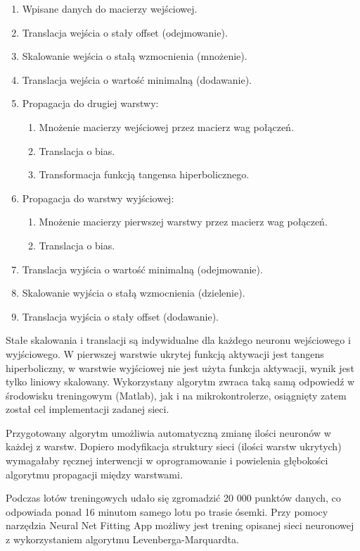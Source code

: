 \documentclass[12pt, a4paper]{article}
\begin{document}
\begin{enumerate}
    \item Wpisane danych do macierzy wejściowej.
	\item Translacja wejścia o stały offset (odejmowanie).
	\item Skalowanie wejścia o stałą wzmocnienia (mnożenie).
	\item Translacja wejścia o wartość minimalną (dodawanie).
	\item Propagacja do drugiej warstwy:
	\begin{enumerate}
		\item Mnożenie macierzy wejściowej przez macierz wag połączeń.
		\item Translacja o bias.
		\item Transformacja funkcją tangensa hiperbolicznego.
	\end{enumerate}
	\item Propagacja do warstwy wyjściowej:
	\begin{enumerate}
		\item Mnożenie macierzy pierwszej warstwy przez macierz wag połączeń.
		\item Translacja o bias.
	\end{enumerate}
	\item Translacja wyjścia o wartość minimalną (odejmowanie).
	\item Skalowanie wyjścia o stałą wzmocnienia (dzielenie).
	\item Translacja wyjścia o stały offset (dodawanie).
\end{enumerate}

Stałe skalowania i translacji są indywidualne dla każdego neuronu wejściowego i wyjściowego. W pierwszej warstwie ukrytej funkcją aktywacji jest tangens hiperboliczny, w warstwie wyjściowej nie jest użyta funkcja aktywacji, wynik jest tylko liniowy skalowany. Wykorzystany algorytm zwraca taką samą odpowiedź w środowisku treningowym (Matlab), jak i na mikrokontrolerze, osiągnięty zatem został cel implementacji zadanej sieci.

Przygotowany algorytm umożliwia automatyczną zmianę ilości neuronów w każdej z warstw. Dopiero modyfikacja struktury sieci (ilości warstw ukrytych) wymagałaby ręcznej interwencji w oprogramowanie i powielenia głębokości algorytmu propagacji między warstwami.

Podczas lotów treningowych udało się zgromadzić 20 000 punktów danych, co odpowiada ponad 16 minutom samego lotu po trasie ósemki. Przy pomocy narzędzia Neural Net Fitting App możliwy jest trening opisanej sieci neuronowej z wykorzystaniem algorytmu Levenberga-Marquardta. 
\end{document}
